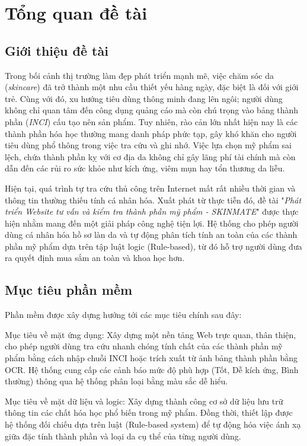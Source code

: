 \documentclass[12pt,a4paper]{article}
\begin{document}
\tableofcontents

\section{Tổng quan đề tài}

\subsection{Giới thiệu đề tài}
Trong bối cảnh thị trường làm đẹp phát triển mạnh mẽ, việc chăm sóc da (\textit{skincare}) đã trở thành một nhu cầu thiết yếu hàng ngày, đặc biệt là đối với giới trẻ. Cùng với đó, xu hướng tiêu dùng thông minh đang lên ngôi; người dùng không chỉ quan tâm đến công dụng quảng cáo mà còn chú trọng vào bảng thành phần (\textit{INCI}) cấu tạo nên sản phẩm. Tuy nhiên, rào cản lớn nhất hiện nay là các thành phần hóa học thường mang danh pháp phức tạp, gây khó khăn cho người tiêu dùng phổ thông trong việc tra cứu và ghi nhớ. Việc lựa chọn mỹ phẩm sai lệch, chứa thành phần kỵ với cơ địa da không chỉ gây lãng phí tài chính mà còn dẫn đến các rủi ro sức khỏe như kích ứng, viêm mụn hay tổn thương da liễu.

Hiện tại, quá trình tự tra cứu thủ công trên Internet mất rất nhiều thời gian và thông tin thường thiếu tính cá nhân hóa. Xuất phát từ thực tiễn đó, đề tài "\textit{Phát triển Website tư vấn và kiểm tra thành phần mỹ phẩm - SKINMATE}" được thực hiện nhằm mang đến một giải pháp công nghệ tiện lợi. Hệ thống cho phép người dùng cá nhân hóa hồ sơ làn da và tự động phân tích tính an toàn của các thành phần mỹ phẩm dựa trên tập luật logic (Rule-based), từ đó hỗ trợ người dùng đưa ra quyết định mua sắm an toàn và khoa học hơn.
\subsection{Mục tiêu phần mềm}
Phần mềm được xây dựng hướng tới các mục tiêu chính sau đây:

Mục tiêu về mặt ứng dụng: Xây dựng một nền tảng Web trực quan, thân thiện, cho phép người dùng tra cứu nhanh chóng tính chất của các thành phần mỹ phẩm bằng cách nhập chuỗi INCI hoặc trích xuất từ ảnh bảng thành phần bằng OCR. Hệ thống cung cấp các cảnh báo mức độ phù hợp (Tốt, Dễ kích ứng, Bình thường) thông qua hệ thống phân loại bằng màu sắc dễ hiểu.

Mục tiêu về mặt dữ liệu và logic: Xây dựng thành công cơ sở dữ liệu lưu trữ thông tin các chất hóa học phổ biến trong mỹ phẩm. Đồng thời, thiết lập được hệ thống đối chiếu dựa trên luật (Rule-based system) để tự động hóa việc ánh xạ giữa đặc tính thành phần và loại da cụ thể của từng người dùng.
\end{document}
